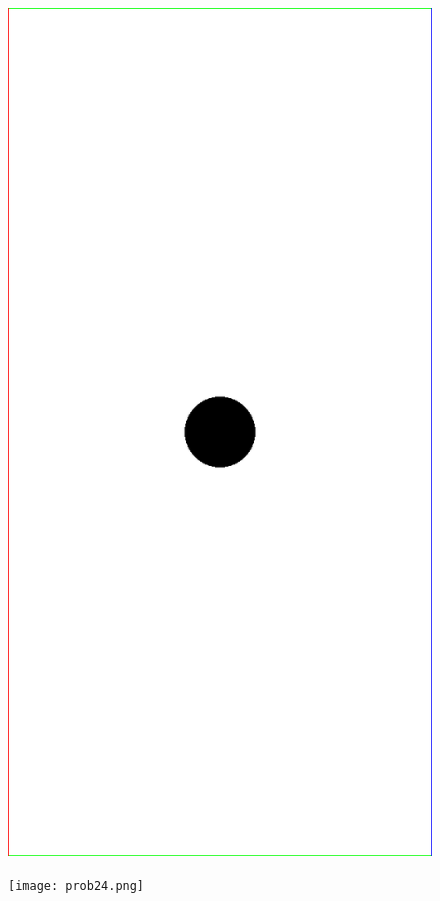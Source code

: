 \documentclass{article}
\begin{document}
\begin{figure}
\centering
\begin{minipage}{.5\textwidth}
  \centering
  \includegraphics[width=.5\linewidth]{prob1HR.png}
  \label{fig:test1}
\end{minipage}%
\begin{minipage}{.5\textwidth}
  \centering
  \texttt{[image: prob24.png]}
  \label{fig:test2}
\end{minipage}
\end{figure}
\end{document}
